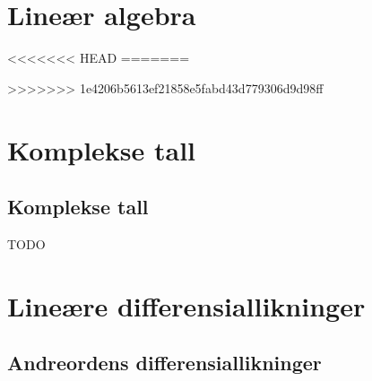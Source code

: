 
\newcommand{\kapittel}[2]{\chapter{#2}}
\newcommand{\kapittelslutt}{}
\renewcommand{\kapittelemnenavn}{}



\def\inkludert{1}


\setlength{\cftpartnumwidth}{3em}

\frontmatter
\tableofcontents*


\mainmatter
\part{Lineær algebra}


















<<<<<<< HEAD
%
=======

>>>>>>> 1e4206b5613ef21858e5fabd43d779306d9d98ff








\part{Komplekse tall}

\chapter{Komplekse tall}

TODO

\part{Lineære differensiallikninger}

\chapter{Andreordens differensiallikninger}

